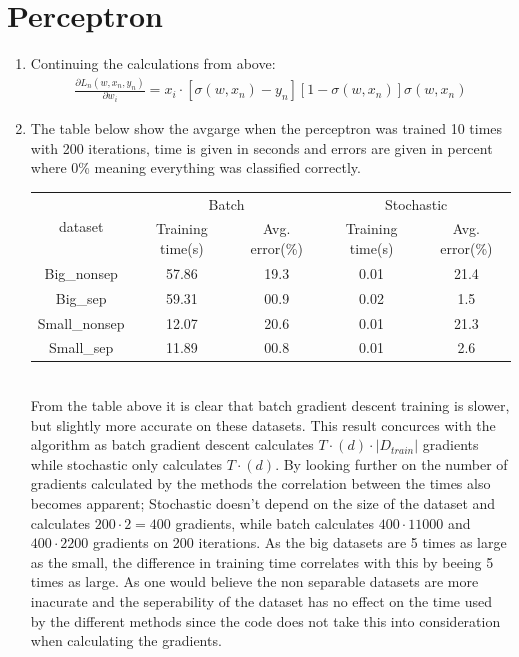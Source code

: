 \documentclass{article}
\newcommand{\abs}[1]{\lvert #1 \rvert}
\begin{document}
\section{Perceptron}
\begin{enumerate}
\item Continuing the calculations from above:
  \begin{align*}
    \frac{\partial L_n(w,x_n,y_n)}{\partial w_i} =
    x_i \cdot \left[ \sigma(w,x_n) - y_n \right] \left[ 1 - \sigma(w,x_n) \right] \sigma(w,x_n)
  \end{align*}

\item The table below show the avgarge when the perceptron was trained 10 times
  with 200 iterations, time is given in seconds and errors are given in percent
  where 0\% meaning everything was classified correctly. \\
  \begin{tabular}{|c|c|c|c|c|}
    \hline
    \multirow{2}{*}{dataset} & \multicolumn{2}{|c|}{Batch} &  \multicolumn{2}{|c|}{Stochastic} \\
    \cline{2-5}
    & Training time(s) & Avg. error(\%) & Training time(s) & Avg. error(\%) \\
    \hline
    Big\_nonsep   & 57.86 & 19.3 & 0.01 & 21.4 \\
    \hline
    Big\_sep      & 59.31 & 00.9 & 0.02 & 1.5 \\
    \hline
    Small\_nonsep & 12.07 & 20.6 & 0.01 & 21.3 \\
    \hline
    Small\_sep    & 11.89 & 00.8 & 0.01 & 2.6 \\
    \hline
  \end{tabular} \\
  From the table above it is clear that batch gradient descent training is
  slower, but slightly more accurate on these datasets. This result concurces
  with the algorithm as batch gradient descent calculates $T \cdot (d) \cdot
  \abs{D_{train}}$ gradients while stochastic only calculates $T \cdot (d)$.
  By looking further on the number of gradients calculated by the methods the
  correlation between the times also becomes apparent; Stochastic doesn't depend
  on the size of the dataset and calculates $200 \cdot 2 = 400$ gradients,
  while batch calculates $400 \cdot 11000$ and $400 \cdot 2200$ gradients on 200
  iterations. As the big datasets are 5 times as large as the small, the
  difference in training time correlates with this by beeing 5 times as large.
  As one would believe the non separable datasets are more inacurate and the
  seperability of the dataset has no effect on the time used by the different
  methods since the code does not take this into consideration when calculating
  the gradients.


\end{enumerate}
\end{document}
